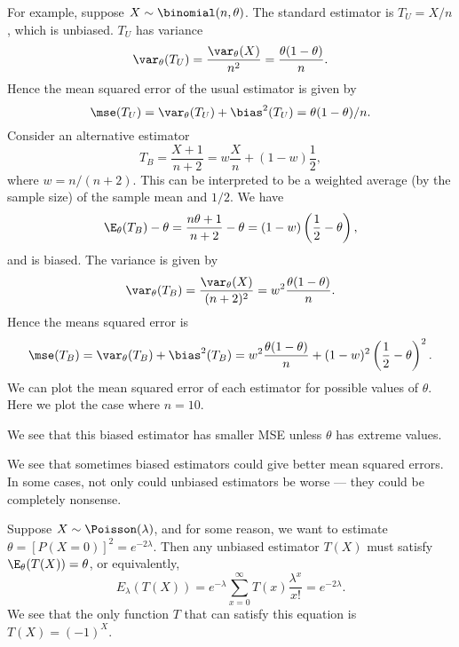 \documentclass[a4paper]{article}
\begin{document}
For example, suppose $X\sim \binomial(n, \theta)$. The standard estimator is $T_U = X/n$, which is unbiased. $T_U$ has variance
\[
  \var_\theta(T_U) = \frac{\var_\theta(X)}{n^2} = \frac{\theta(1 - \theta)}{n}.
\]
Hence the mean squared error of the usual estimator is given by
\[
  \mse (T_U) = \var_\theta(T_U) + \bias^2(T_U) = \theta(1 - \theta)/n.
\]
Consider an alternative estimator
\[
  T_B = \frac{X + 1}{n + 2} = w\frac{X}{n} + (1 - w)\frac{1}{2},
\]
where $w = n/(n + 2)$. This can be interpreted to be a weighted average (by the sample size) of the sample mean and $1/2$. We have
\[
  \E_\theta(T_B) - \theta = \frac{n\theta + 1}{n + 2} - \theta = (1 - w)\left(\frac{1}{2} - \theta\right),
\]
and is biased. The variance is given by
\[
  \var_\theta(T_B) = \frac{\var_\theta(X)}{(n + 2)^2} = w^2\frac{\theta(1 - \theta)}{n}.
\]
Hence the means squared error is
\[
  \mse (T_B) = \var_\theta(T_B) + \bias^2(T_B) = w^2\frac{\theta(1 - \theta)}{n} + (1 - w)^2\left(\frac{1}{2} - \theta\right)^2.
\]
We can plot the mean squared error of each estimator for possible values of $\theta$. Here we plot the case where $n = 10$.
\begin{center}
\end{center}
We see that this biased estimator has smaller MSE unless $\theta$ has extreme values.

We see that sometimes biased estimators could give better mean squared errors. In some cases, not only could unbiased estimators be worse --- they could be completely nonsense.

Suppose $X\sim \Poisson(\lambda)$, and for some reason, we want to estimate $\theta = [P(X = 0)]^2 = e^{-2\lambda}$. Then any unbiased estimator $T(X)$ must satisfy $\E_\theta(T(X)) = \theta$, or equivalently,
\[
  E_\lambda(T(X)) = e^{-\lambda}\sum_{x = 0}^\infty T(x) \frac{\lambda^x}{x!} = e^{-2\lambda}.
\]
We see that the only function $T$ that can satisfy this equation is $T(X) = (-1)^X$.
\end{document}

